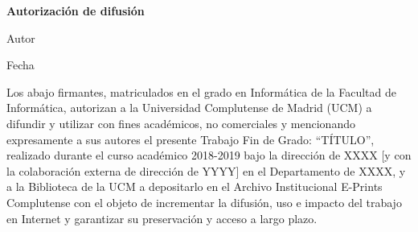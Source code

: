 
\newpage

\thispagestyle{empty}

\begin{center}

{\bf \Huge Autorización de difusión}

\vspace{1cm}


   \large Autor\\

   \vspace{0.5cm}


   Fecha\\

   \vspace{0.5cm}
   \end{center}
   
Los abajo firmantes, matriculados en el grado en Informática de la Facultad de Informática, autorizan a la Universidad Complutense de Madrid (UCM) a difundir y utilizar con fines académicos, no comerciales y mencionando expresamente a sus autores el presente Trabajo Fin de Grado: “TÍTULO”, realizado durante el curso académico 2018-2019 bajo la dirección de XXXX [y con la colaboración externa de dirección de YYYY] en el Departamento de XXXX, y a la Biblioteca de la UCM a depositarlo en el Archivo Institucional E-Prints Complutense con el objeto de incrementar la difusión, uso e impacto del trabajo en Internet y garantizar su preservación y acceso a largo plazo.

